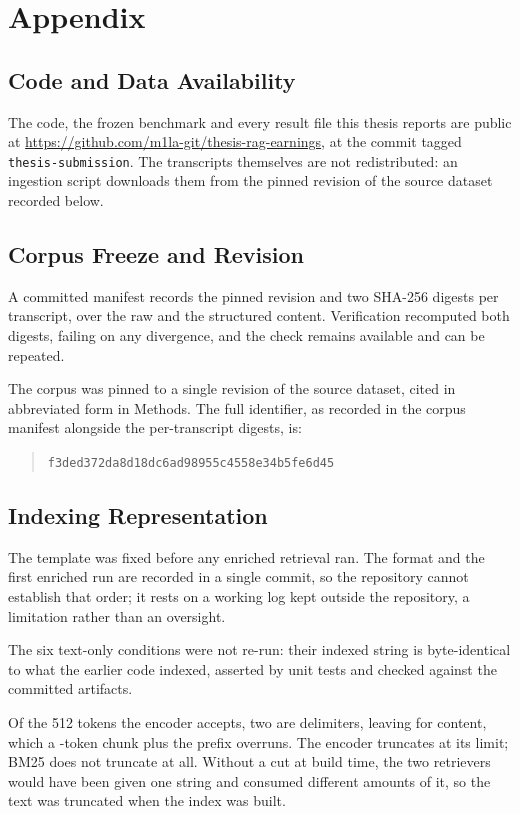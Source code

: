 \chapter{Appendix}

\section{Code and Data Availability}

The code, the frozen benchmark and every result file this thesis reports are
public at \url{https://github.com/m1la-git/thesis-rag-earnings}, at the commit
tagged \texttt{thesis-submission}. The transcripts themselves are not
redistributed: an ingestion script downloads them from the pinned revision of
the source dataset recorded below.

\section{Corpus Freeze and Revision}

A committed manifest records the pinned revision and two SHA-256 digests per
transcript, over the raw and the structured content. Verification recomputed
both digests, failing on any divergence, and the check remains available and
can be repeated.

The corpus was pinned to a single revision of the source dataset, cited in
abbreviated form in Methods. The full identifier, as recorded in the corpus
manifest alongside the per-transcript digests, is:

\begin{quote}
\texttt{f3ded372da8d18dc6ad98955c4558e34b5fe6d45}
\end{quote}

\section{Indexing Representation}

The template was fixed before any enriched retrieval ran. The format and the
first enriched run are recorded in a single commit, so the repository cannot
establish that order; it rests on a working log kept outside the repository, a
limitation rather than an oversight.

The six text-only conditions were not re-run: their indexed string is
byte-identical to what the earlier code indexed, asserted by unit tests and
checked against the committed artifacts.

Of the 512 tokens the encoder accepts, two are delimiters, leaving
\thesisMaxContentTokens{} for content, which a \thesisChunkSizeLarge{}-token
chunk plus the prefix overruns. The encoder truncates at its limit; BM25 does
not truncate at all. Without a cut at build time, the two retrievers would have
been given one string and consumed different amounts of it, so the text was
truncated when the index was built.

